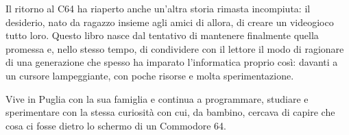 \documentclass{article}
\begin{document}
Il ritorno al C64 ha riaperto anche un'altra storia rimasta incompiuta: il desiderio, nato da ragazzo insieme agli amici
di allora, di creare un videogioco tutto loro. Questo libro nasce dal tentativo di mantenere finalmente quella promessa
e, nello stesso tempo, di condividere con il lettore il modo di ragionare di una generazione che spesso ha imparato
l'informatica proprio così: davanti a un cursore lampeggiante, con poche risorse e molta sperimentazione.

Vive in Puglia con la sua famiglia e continua a programmare, studiare e sperimentare con la stessa curiosità con cui, da
bambino, cercava di capire che cosa ci fosse dietro lo schermo di un Commodore 64.
\end{document}
